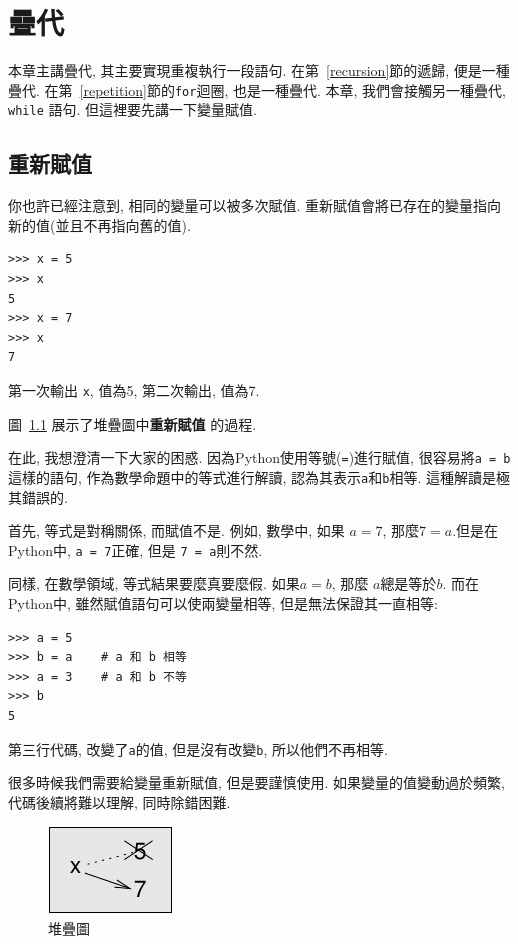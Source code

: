 \documentclass[10pt]{book}
\begin{document}
\chapter{疊代}

本章主講疊代, 其主要實現重複執行一段語句. 
在第~\ref{recursion}節的遞歸, 便是一種疊代. 
在第~\ref{repetition}節的{\tt for}迴圈, 也是一種疊代. 
本章, 我們會接觸另一種疊代, {\tt while} 語句. 
但這裡要先講一下變量賦值. 

\section{重新賦值}

你也許已經注意到, 相同的變量可以被多次賦值. 
重新賦值會將已存在的變量指向新的值(並且不再指向舊的值).

\begin{verbatim}
>>> x = 5
>>> x
5
>>> x = 7
>>> x
7
\end{verbatim}
%
第一次輸出{ \tt x}, 值為5, 第二次輸出, 值為7.

圖~\ref{fig.assign2}  展示了堆疊圖中{\bf 重新賦值}
的過程.  

在此, 我想澄清一下大家的困惑.
因為Python使用等號({\tt =})進行賦值, 
很容易將{\tt a = b}這樣的語句, 作為數學命題中的等式進行解讀, 
認為其表示{\tt a}和{\tt b}相等. 
這種解讀是極其錯誤的. 

首先, 等式是對稱關係, 而賦值不是. 
例如, 數學中, 如果 $a=7$, 那麼$7=a$.但是在Python中, 
{\tt a = 7}正確, 但是 {\tt 7 = a}則不然. 

同樣, 在數學領域, 等式結果要麼真要麼假. 
如果$a=b$, 那麼 $a$總是等於$b$. 
而在Python中, 雖然賦值語句可以使兩變量相等, 但是無法保證其一直相等:

\begin{verbatim}
>>> a = 5
>>> b = a    # a 和 b 相等
>>> a = 3    # a 和 b 不等
>>> b
5
\end{verbatim}
%
第三行代碼, 改變了{\tt a}的值, 但是沒有改變{\tt b}, 所以他們不再相等. 

很多時候我們需要給變量重新賦值, 但是要謹慎使用. 
如果變量的值變動過於頻繁, 代碼後續將難以理解, 同時除錯困難. 

\begin{figure}
\centerline
{\includegraphics[scale=0.8]{figs/assign2.pdf}}
\caption{堆疊圖}
\label{fig.assign2}
\end{figure}
\end{document}
